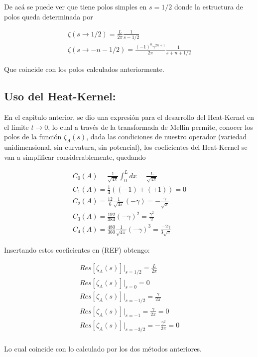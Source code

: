 De acá se puede ver que tiene polos simples en $s=1/2$ donde la estructura de polos queda determinada por

\begin{equation}
\begin{array}{c}

\zeta(s \rightarrow 1/2) = \frac{L}{2 \pi} \frac{1}{s-1/2} \\
\zeta (s \rightarrow -n - 1/2)  = \frac{ (-1) ^n \gamma ^{2n+1}  }{2 \pi} \frac{1}{s + n + 1/2}

\end{array}
\end{equation}


Que coincide con los polos calculados anteriormente.


\subsection{Uso del Heat-Kernel:}

En el capitulo anterior, se dio una expresión para el desarrollo del Heat-Kernel en el limite $t \rightarrow 0$, lo cual a través de la transformada de Mellin permite, conocer los polos de la función $\zeta _A (s)$, dada las condiciones de nuestro operador (variedad unidimensional, sin curvatura, sin potencial), los coeficientes del Heat-Kernel se van a simplificar considerablemente, quedando

\begin{equation}
\begin{array}{c}
C _0 (A) = \frac{1}{\sqrt{4 \pi}} \int _{0} ^{L} dx = \frac{L}{\sqrt{4 \pi}} \\
C _1 (A) = \frac{1}{4} \left( (-1) + (+1) \right) = 0 \\
C _2 (A) = \frac{12}{6} \frac{1}{\sqrt{4 \pi }} \left(  - \gamma \right) = - \frac{\gamma}{\sqrt{\pi}} \\
C _3 (A) = \frac{192}{384}  (- \gamma ) ^2 = \frac{\gamma ^2}{2} \\
C _4 (A) = \frac{480}{360} \frac{1}{\sqrt{4 \pi}} (- \gamma) ^3 = \frac{-2 \gamma}{3 \sqrt{\pi}}

\end{array}
\end{equation}

Insertando estos coeficientes en (REF) obtengo:

\begin{equation}
\begin{array}{c}
Res[ \zeta _A (s)] | _{s=1/2} = \frac{L}{2 \pi} \\
Res[ \zeta _A (s)] | _{s=0} = 0 \\
Res[ \zeta _A (s)] | _{s=-1/2} = \frac{\gamma}{2 \pi} \\
Res[ \zeta _A (s)] | _{s=-1} = \frac{\gamma}{2 \pi} = 0 \\
Res[ \zeta _A (s)] | _{s=-3/2} = - \frac{\gamma ^2}{2 \pi} = 0 \\


\end{array}
\end{equation}

Lo cual coincide con lo calculado por los dos métodos anteriores.
